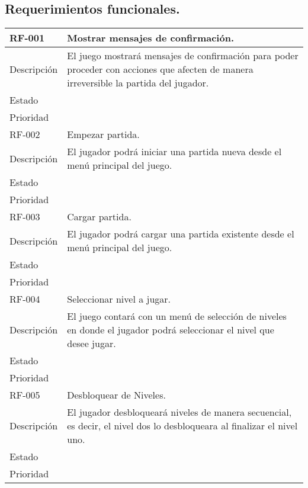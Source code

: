\subsection{Requerimientos funcionales.}
	\begin{longtable}[c]{ | m{5cm} | m{10cm}|} 
		\hline
		\rowcolor{cyan}RF-001\label{RF:01} & Mostrar mensajes de confirmación. \\ 
		\hline
		Descripción	& El juego mostrará mensajes de confirmación para poder proceder con acciones que afecten de manera irreversible la partida del jugador. \\ 
		\hline
		Estado &  \\ 
		\hline
		Prioridad &  \\
		\hline
		\rowcolor{cyan}RF-002\label{RF:02} & Empezar partida. \\ 
		\hline
		Descripción	& El jugador podrá iniciar una partida nueva desde el menú principal del juego. \\ 
		\hline
		Estado &  \\ 
		\hline
		Prioridad &  \\
		\hline
		\rowcolor{cyan}RF-003\label{RF:03} & Cargar partida.\\ 
		\hline
		Descripción	& El jugador podrá cargar una partida existente desde el menú principal del juego. \\ 
		\hline
		Estado &  \\ 
		\hline
		Prioridad &  \\
		\hline
		\rowcolor{cyan}RF-004\label{RF:04} & Seleccionar nivel a jugar. \\ 
		\hline
		Descripción	& El juego contará con un menú de selección de niveles en donde el jugador podrá seleccionar el nivel que desee jugar. \\ 
		\hline
		Estado &  \\ 
		\hline
		Prioridad &  \\
		\hline
		\rowcolor{cyan}RF-005\label{RF:05} & Desbloquear de Niveles. \\ 
		\hline
		Descripción	& El jugador desbloqueará niveles de manera secuencial, es decir, el nivel dos lo desbloqueara al finalizar el nivel uno. \\ 
		\hline
		Estado &  \\ 
		\hline
		Prioridad &  \\

\end{longtable}
